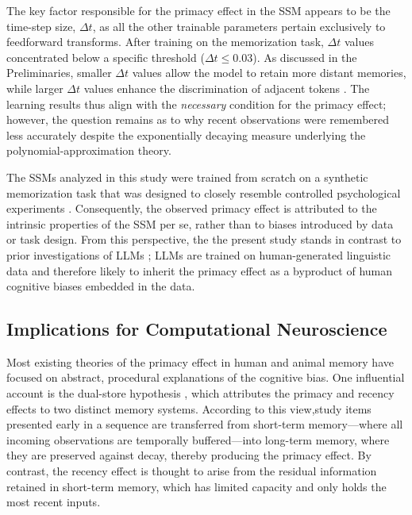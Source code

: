 \documentclass[10pt,letterpaper]{article}
\begin{document}
The key factor responsible for the primacy effect in the SSM appears to be the time-step size, $\Delta t$, as all the other trainable parameters pertain exclusively to feedforward transforms.
After training on the memorization task, $\Delta t$ values concentrated below a specific threshold ($\Delta t \leq 0.03$).
As discussed in the Preliminaries, smaller $\Delta t$ values allow the model to retain more distant memories, while larger $\Delta t$ values enhance the discrimination of adjacent tokens \citep[][]{Gu+21,GuDao24}.
The learning results thus align with the \emph{necessary} condition for the primacy effect;
however, the question remains as to why recent observations were remembered less accurately despite the exponentially decaying measure underlying the polynomial-approximation theory.

The SSMs analyzed in this study were trained from scratch on a synthetic memorization task that was designed to closely resemble controlled psychological experiments \citep{WickelgrenNorman66,ThompsonHerman77,SandsWright80,Wright+85}.
Consequently, the observed primacy effect is attributed to the intrinsic properties of the SSM per se, rather than to biases introduced by data or task design.
From this perspective, the the present study stands in contrast to prior investigations of LLMs \citep{Wang+23_primacy-effect,EicherIrgolic24,GuoVosoughi24,Janik24,Liu+24,Xiao+24};
LLMs are trained on human-generated linguistic data and therefore likely to inherit the primacy effect as a byproduct of human cognitive biases embedded in the data.

\subsection{Implications for Computational Neuroscience}

Most existing theories of the primacy effect in human and animal memory have focused on abstract, procedural explanations of the cognitive bias.
One influential account is the dual-store hypothesis \citep[][]{WaughNorman65,GlanzerCunitz66,AtkinsonShiffrin68}, which attributes the primacy and recency effects to two distinct memory systems.
According to this view,study items presented early in a sequence are transferred from short-term memory---where all incoming observations are temporally buffered---into long-term memory, where they are preserved against decay, thereby producing the primacy effect.
By contrast, the recency effect is thought to arise from the residual information retained in short-term memory, which has limited capacity and only holds the most recent inputs.
\end{document}
